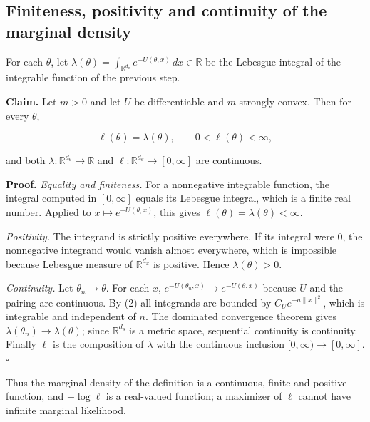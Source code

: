 \documentclass[11pt,a4paper]{report}
\begin{document}
\subsection{\texorpdfstring{Finiteness, positivity and continuity of the marginal density}{Finiteness, positivity and continuity of the marginal density}}
\label{report-step-IPLA-MarginalConcentration-lean-3}


For each \(\theta\), let \(\lambda(\theta)=\int_{\mathbb R^{d_x}}e^{-U(\theta,x)}\,dx\in\mathbb R\) be the Lebesgue integral of the integrable function of the previous step.




\textbf{Claim.} Let \(m>0\) and let \(U\) be differentiable and \(m\)-strongly convex. Then for every \(\theta\),


\[\ell(\theta)=\lambda(\theta),\qquad0<\ell(\theta)<\infty,\]


and both \(\lambda:\mathbb R^{d_\theta}\to\mathbb R\) and \(\ell:\mathbb R^{d_\theta}\to[0,\infty]\) are continuous.




\textbf{Proof.} \emph{Equality and finiteness.} For a nonnegative integrable function, the integral computed in \([0,\infty]\) equals its Lebesgue integral, which is a finite real number. Applied to \(x\mapsto e^{-U(\theta,x)}\), this gives \(\ell(\theta)=\lambda(\theta)<\infty\).




\emph{Positivity.} The integrand is strictly positive everywhere. If its integral were \(0\), the nonnegative integrand would vanish almost everywhere, which is impossible because Lebesgue measure of \(\mathbb R^{d_x}\) is positive. Hence \(\lambda(\theta)>0\).




\emph{Continuity.} Let \(\theta_n\to\theta\). For each \(x\), \(e^{-U(\theta_n,x)}\to e^{-U(\theta,x)}\) because \(U\) and the pairing are continuous. By (2) all integrands are bounded by \(C_Ue^{-a\|x\|^2}\), which is integrable and independent of \(n\). The dominated convergence theorem gives \(\lambda(\theta_n)\to\lambda(\theta)\); since \(\mathbb R^{d_\theta}\) is a metric space, sequential continuity is continuity. Finally \(\ell\) is the composition of \(\lambda\) with the continuous inclusion \([0,\infty)\to[0,\infty]\). \(\square\)




Thus the marginal density of the definition is a continuous, finite and positive function, and \(-\log\ell\) is a real-valued function; a maximizer of \(\ell\) cannot have infinite marginal likelihood.
\end{document}
